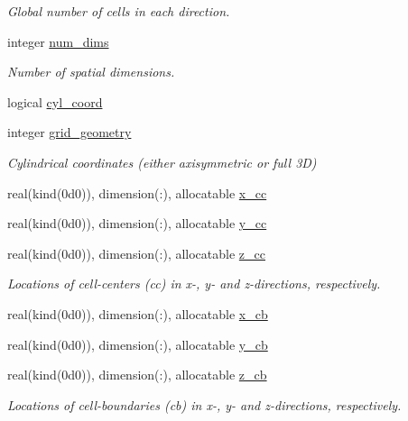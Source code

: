 \begin{DoxyCompactItemize}
\begin{DoxyCompactList}\small\item\em Global number of cells in each direction. \end{DoxyCompactList}\item 
integer \hyperlink{namespacem__global__parameters_a76e251296a28212df87bf9f653ff9a3b}{num\+\_\+dims}
\begin{DoxyCompactList}\small\item\em Number of spatial dimensions. \end{DoxyCompactList}\item 
logical \hyperlink{namespacem__global__parameters_a53f0d5eed7783c9760aaeeaa0abbd58c}{cyl\+\_\+coord}
\item 
integer \hyperlink{namespacem__global__parameters_a0f2d413d9739928f8e1a98f0a5783ab9}{grid\+\_\+geometry}
\begin{DoxyCompactList}\small\item\em Cylindrical coordinates (either axisymmetric or full 3D) \end{DoxyCompactList}\item 
real(kind(0d0)), dimension(\+:), allocatable \hyperlink{namespacem__global__parameters_aaf315f1df492ccc9daaeee046f185bb5}{x\+\_\+cc}
\item 
real(kind(0d0)), dimension(\+:), allocatable \hyperlink{namespacem__global__parameters_ad7e05d3d526e5dfa14a74ffda890e63d}{y\+\_\+cc}
\item 
real(kind(0d0)), dimension(\+:), allocatable \hyperlink{namespacem__global__parameters_a2c4b9e99b981dc55cccf0b153159404e}{z\+\_\+cc}
\begin{DoxyCompactList}\small\item\em Locations of cell-\/centers (cc) in x-\/, y-\/ and z-\/directions, respectively. \end{DoxyCompactList}\item 
real(kind(0d0)), dimension(\+:), allocatable \hyperlink{namespacem__global__parameters_abd9ada93ee5222de406111ee9c91ddf0}{x\+\_\+cb}
\item 
real(kind(0d0)), dimension(\+:), allocatable \hyperlink{namespacem__global__parameters_aa436c56a050419e85c8c08611a688e63}{y\+\_\+cb}
\item 
real(kind(0d0)), dimension(\+:), allocatable \hyperlink{namespacem__global__parameters_a1f932e794cad6291b2e6c62b93dcf533}{z\+\_\+cb}
\begin{DoxyCompactList}\small\item\em Locations of cell-\/boundaries (cb) in x-\/, y-\/ and z-\/directions, respectively. \end{DoxyCompactList}\item 

\end{DoxyCompactItemize}
